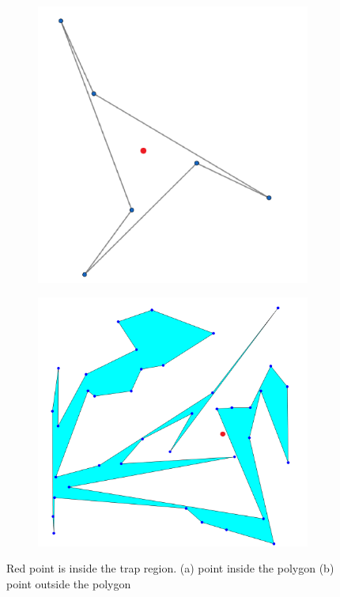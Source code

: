 \documentclass[conference]{IEEEtran}
\begin{document}
			\begin{figure}[htbp]
				\centering
				\begin{subfigure}{0.49\linewidth}
					\centering
					\includegraphics[width=0.99\textwidth]{fig3a.png}
					\caption{}
					\label{fig3a}
				\end{subfigure}
				\begin{subfigure}{0.49\linewidth}
					\centering
					\includegraphics[width=0.99\textwidth]{fig3b.png}
					\caption{}
					\label{fig3b}
				\end{subfigure}
				\caption
				{
					Red point is inside the trap region.
					(a) point inside the polygon
					(b) point outside the polygon 
				}
				\label{fig3}
			\end{figure}
\end{document}
